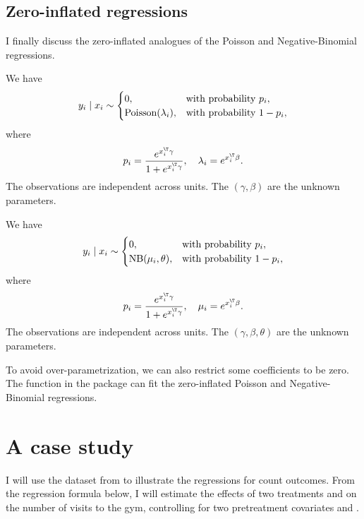 \subsection{Zero-inflated regressions}

I finally discuss the zero-inflated analogues of the Poisson and Negative-Binomial regressions. 

\begin{assumption}
\label{assume::0-poisson-reg}
We have 
\[
y_{i}\mid x_{i}\sim\begin{cases}
0, & \text{with probability }p_{i},\\
\textup{Poisson}(\lambda_{i}), & \text{with probability }1-p_{i},
\end{cases}
\]
where 
$$
p_{i}  =\frac{e^{x_{i}^{\T}\gamma}}{1+e^{x_{i}^{\T}\gamma}},\quad 
\lambda_{i}  = e^{x_{i}^{\T}\beta}.
$$
The observations are independent across units. The $(\gamma, \beta)$ are the unknown parameters. 
\end{assumption}

 
 
\begin{assumption}
\label{assume::0-nb-reg}
We have 
\[
y_{i}\mid x_{i}\sim\begin{cases}
0, & \text{with probability }p_{i},\\
\textup{NB}(\mu_{i},\theta), & \text{with probability }1-p_{i},
\end{cases}
\]
where 
$$
p_{i}  =\frac{e^{x_{i}^{\T}\gamma}}{1+e^{x_{i}^{\T}\gamma}},\quad 
\mu_{i}  = e^{x_{i}^{\T}\beta} .
$$
The observations are independent across units. The $(\gamma, \beta, \theta)$ are the unknown parameters. 
\end{assumption}

 
  

To avoid over-parametrization, we can also restrict some coefficients
to be zero. 
The   function in the  package  can fit the zero-inflated Poisson and Negative-Binomial regressions. 


\section{A case study}\label{sec::count-case-study}

I will use the dataset from \citet{royer2015incentives} to illustrate the regressions for count outcomes. From the regression formula below, I will estimate the effects of two treatments  and  on the number of visits to the gym, controlling for two pretreatment covariates  and . 

